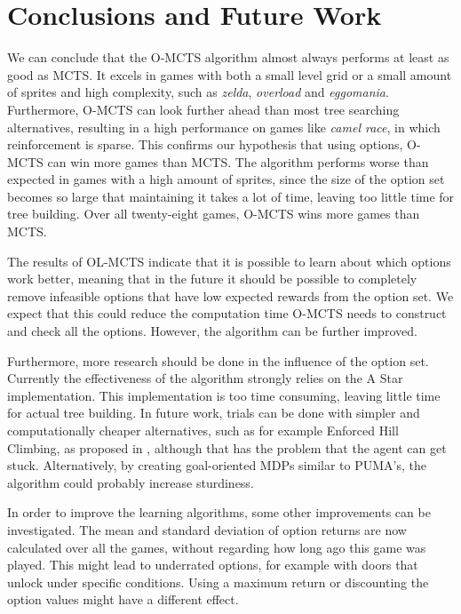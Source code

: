 \section{Conclusions and Future Work}
\label{sec:conclusion}
We can conclude that the O-MCTS algorithm almost always performs at least
as good as MCTS\@. It excels in games with both a small level grid or a small
amount of sprites and high complexity, such as \textit{zelda}, \textit{overload}
and \textit{eggomania}.  Furthermore, O-MCTS can look further ahead than most
tree searching alternatives, resulting in a high performance on games like
\textit{camel race}, in which reinforcement is sparse. This confirms our
hypothesis that using options, O-MCTS can win more games than MCTS\@. The
algorithm performs worse than expected in games with a high amount of sprites,
since the size of the option set becomes so large that maintaining it takes a
lot of time, leaving too little time for tree building. Over all twenty-eight
games, O-MCTS wins more games than MCTS\@.

The results of OL-MCTS indicate that it is possible to learn about which options
work better, meaning that in the future it should be possible to completely
remove infeasible options that have low expected rewards from the option set. We
expect that this could reduce the computation time O-MCTS needs to construct and
check all the options. However, the algorithm can be further improved.

Furthermore, more research should be done in the influence of the option set.
Currently the effectiveness of the algorithm strongly relies on the A Star
implementation. This implementation is too time consuming, leaving
little time for actual tree building. In future work, trials can be done with
simpler and computationally cheaper alternatives, such as for example Enforced
Hill Climbing, as proposed in \cite{ross2014general}, although that has the
problem that the agent can get stuck. Alternatively, by creating goal-oriented
MDPs similar to PUMA's, the algorithm could probably increase sturdiness.

In order to improve the learning algorithms, some other improvements can be
investigated. 
The mean and standard deviation of option returns are now calculated over all
the games, without regarding how long ago this game was played. This might lead
to underrated options, for example with doors that unlock under specific
conditions.  Using a maximum return or discounting the option values might have
a different effect.

